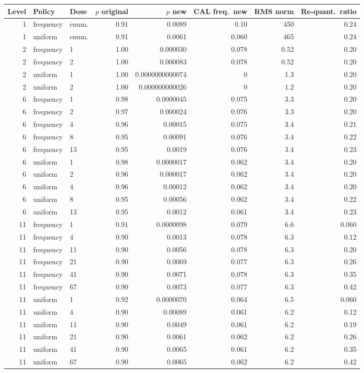 \begin{tabular}{rllrrrrr}
\toprule
Level & Policy & Dose & $p$ original & $p$ new & CAL freq.\ new & RMS norm & Re-quant.\ ratio \\
\midrule
1 & frequency & enum. & 0.91 & 0.0089 & 0.10 & 450 & 0.24 \\
1 & uniform & enum. & 0.91 & 0.0061 & 0.060 & 465 & 0.24 \\
2 & frequency & 1 & 1.00 & 0.000030 & 0.078 & 0.52 & 0.20 \\
2 & frequency & 2 & 1.00 & 0.000083 & 0.078 & 0.52 & 0.20 \\
2 & uniform & 1 & 1.00 & 0.0000000000074 & 0 & 1.3 & 0.20 \\
2 & uniform & 2 & 1.00 & 0.000000000026 & 0 & 1.2 & 0.20 \\
6 & frequency & 1 & 0.98 & 0.0000045 & 0.075 & 3.3 & 0.20 \\
6 & frequency & 2 & 0.97 & 0.000024 & 0.076 & 3.3 & 0.20 \\
6 & frequency & 4 & 0.96 & 0.00015 & 0.075 & 3.4 & 0.21 \\
6 & frequency & 8 & 0.95 & 0.00091 & 0.076 & 3.4 & 0.22 \\
6 & frequency & 13 & 0.95 & 0.0019 & 0.076 & 3.4 & 0.23 \\
6 & uniform & 1 & 0.98 & 0.0000017 & 0.062 & 3.4 & 0.20 \\
6 & uniform & 2 & 0.96 & 0.000017 & 0.062 & 3.4 & 0.20 \\
6 & uniform & 4 & 0.96 & 0.00012 & 0.062 & 3.4 & 0.20 \\
6 & uniform & 8 & 0.95 & 0.00056 & 0.062 & 3.4 & 0.22 \\
6 & uniform & 13 & 0.95 & 0.0012 & 0.061 & 3.4 & 0.23 \\
11 & frequency & 1 & 0.91 & 0.0000098 & 0.079 & 6.6 & 0.060 \\
11 & frequency & 4 & 0.90 & 0.0013 & 0.078 & 6.3 & 0.12 \\
11 & frequency & 11 & 0.90 & 0.0056 & 0.078 & 6.3 & 0.20 \\
11 & frequency & 21 & 0.90 & 0.0069 & 0.077 & 6.3 & 0.26 \\
11 & frequency & 41 & 0.90 & 0.0071 & 0.078 & 6.3 & 0.35 \\
11 & frequency & 67 & 0.90 & 0.0073 & 0.077 & 6.3 & 0.42 \\
11 & uniform & 1 & 0.92 & 0.0000070 & 0.064 & 6.5 & 0.060 \\
11 & uniform & 4 & 0.90 & 0.00089 & 0.061 & 6.2 & 0.12 \\
11 & uniform & 11 & 0.90 & 0.0049 & 0.061 & 6.2 & 0.19 \\
11 & uniform & 21 & 0.90 & 0.0061 & 0.062 & 6.2 & 0.26 \\
11 & uniform & 41 & 0.90 & 0.0065 & 0.061 & 6.2 & 0.35 \\
11 & uniform & 67 & 0.90 & 0.0065 & 0.062 & 6.2 & 0.42 \\
\bottomrule
\end{tabular}
